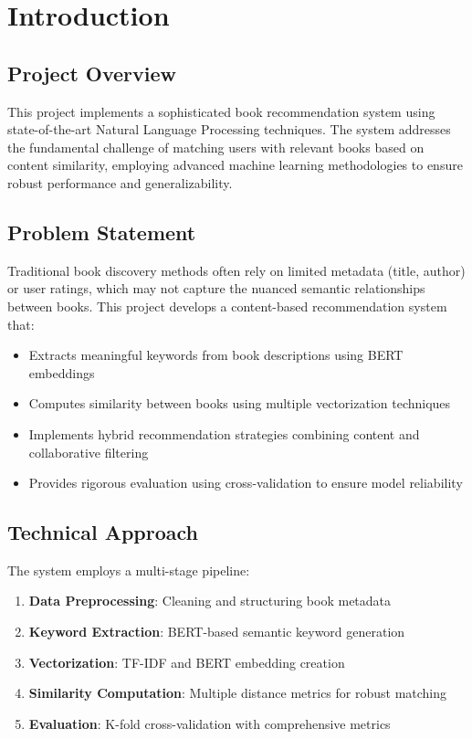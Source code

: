 \documentclass[12pt,a4paper]{article}
\begin{document}
\listoffigures
\newpage

\listoftables
\newpage

\section{Introduction}

\subsection{Project Overview}
This project implements a sophisticated book recommendation system using state-of-the-art Natural Language Processing techniques. The system addresses the fundamental challenge of matching users with relevant books based on content similarity, employing advanced machine learning methodologies to ensure robust performance and generalizability.

\subsection{Problem Statement}
Traditional book discovery methods often rely on limited metadata (title, author) or user ratings, which may not capture the nuanced semantic relationships between books. This project develops a content-based recommendation system that:
\begin{itemize}
    \item Extracts meaningful keywords from book descriptions using BERT embeddings
    \item Computes similarity between books using multiple vectorization techniques
    \item Implements hybrid recommendation strategies combining content and collaborative filtering
    \item Provides rigorous evaluation using cross-validation to ensure model reliability
\end{itemize}

\subsection{Technical Approach}
The system employs a multi-stage pipeline:
\begin{enumerate}
    \item \textbf{Data Preprocessing}: Cleaning and structuring book metadata
    \item \textbf{Keyword Extraction}: BERT-based semantic keyword generation
    \item \textbf{Vectorization}: TF-IDF and BERT embedding creation
    \item \textbf{Similarity Computation}: Multiple distance metrics for robust matching
    \item \textbf{Evaluation}: K-fold cross-validation with comprehensive metrics
\end{enumerate}
\end{document}

